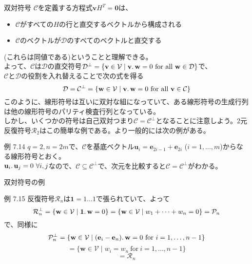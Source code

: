 \documentclass[dvipdfmx,10pt,jsarticle]{beamer}
\begin{document}
  \begin{frame}{双対符号}
    $\mathcal{C}$を定義する方程式$\mathbf{v}H^T = \mathbf{0}$は、
    \begin{itemize}
      \item $\mathcal{C}$がすべての$H$の行と直交するベクトルから構成される
      \item $\mathcal{C}$のベクトルが$\mathcal{D}$のすべてのベクトルと直交する
    \end{itemize}
    (これらは同値である)ということと理解できる。\\
    よって、$\mathcal{C}$は$\mathcal{D}$の直交符号$\mathcal{D}^\perp = \lbrace \mathbf{v} \in \mathcal{V} \mid \mathbf{v}\ldotp\mathbf{w} = 0 \ \text{for all} \ \mathbf{w} \in \mathcal{D} \rbrace$で、\\
    $\mathcal{C}$と$\mathcal{D}$の役割を入れ替えることで次の式を得る
    \[ \mathcal{D} = \mathcal{C}^\perp = \lbrace \mathbf{w} \in \mathcal{V} \mid \mathbf{v}\ldotp\mathbf{w} = 0 \ \text{for all} \ \mathbf{v} \in \mathcal{C} \rbrace \]
    このように、線形符号は互いに双対な組になっていて、ある線形符号の生成行列は他の線形符号のパリティ検査行列となっている。\\
    しかし、いくつかの符号は自己双対つまり$\mathcal{C}=\mathcal{C}^\perp$となることに注意しよう。2元反復符号$\mathcal{R}_2$はこの簡単な例である。より一般的には次の例がある。
    \begin{block}{例 7.14}
      $q = 2, n = 2m$で、$\mathcal{C}$を基底ベクトル$\mathbf{u}_i = \mathbf{e}_{2i - 1} + \mathbf{e}_{2i}$ ($i = 1, \ldots , m$)からなる線形符号とおく。\\
      $\mathbf{u}_i\ldotp\mathbf{u}_j = 0 \ \forall i, j$なので、$\mathcal{C} \subseteq \mathcal{C}^\perp$で、次元を比較すると$\mathcal{C} = \mathcal{C}^\perp$がわかる。
    \end{block}
  \end{frame}
  \begin{frame}{双対符号の例}
    \begin{block}{例 7.15}
      反復符号$\mathcal{R}_n$は$\mathbf{1}=1\ldots1$で張られていて、よって
      \[ \mathcal{R}_n^\perp = \lbrace \mathbf{w} \in \mathcal{V} \mid \mathbf{1} \ldotp \mathbf{w} = 0 \rbrace = \lbrace \mathbf{w} \in \mathcal{V} \mid w_1 + \cdots + w_n = 0 \rbrace = \mathcal{P}_n \]
      で、同様に
    \[\mathcal{P}_n^\perp = \lbrace \mathbf{w} \in \mathcal{V} \mid (\mathbf{e}_i - \mathbf{e}_n)\ldotp\mathbf{w} = 0 \ \text{for}\ i = 1,\ldots,n-1 \rbrace \]
      \[= \lbrace \mathbf{w} \in \mathcal{V} \mid w_i = w_n \ \text{for} \ i = 1,\ldots , n-1 \rbrace \]
      \[= \mathcal{R}_n \]
    \end{block}
  \end{frame}
\end{document}
